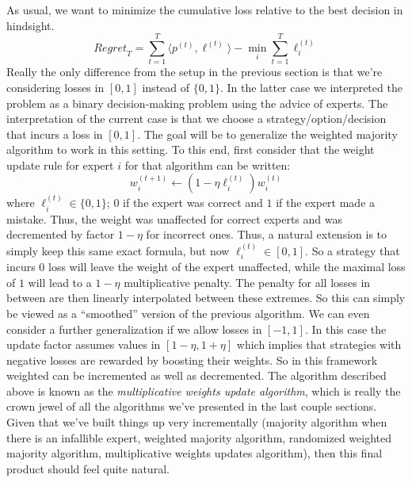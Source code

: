 \documentclass[12pt]{article}
\begin{document}
As usual, we want to minimize the cumulative loss relative to the best decision in hindsight. 
\[\textit{Regret}_T = \sum_{t = 1}^{T} \langle p^{(t)}, \ell^{(t)}\rangle - \min_i \sum_{t = 1}^{T} \ell_i^{(t)}\]
Really the only difference from the setup in the previous section is that we're considering losses in $[0, 1]$ instead of $\{0, 1\}$. In the latter case we interpreted the problem as a binary decision-making
problem using the advice of experts. The interpretation of the current case is that we choose a strategy/option/decision that incurs a loss in $[0, 1]$. The goal will be to generalize the weighted majority 
algorithm to work in this setting. To this end, first consider that the weight update rule for expert $i$ for that algorithm can be written:
\[w_i^{(t + 1)} \gets (1 - \eta \ell_i^{(t)})w_i^{(t)}\]
where $\ell_i^{(t)} \in \{0, 1\}$; $0$ if the expert was correct and $1$ if the expert made a mistake. Thus, the weight was unaffected for correct experts and was decremented by factor $1 - \eta$ for 
incorrect ones. Thus, a natural extension is to simply keep this same exact formula, but now $ \ell_i^{(t)} \in [0, 1]$. So a strategy that incurs $0$ loss will leave the weight of the expert unaffected, while 
the maximal loss of $1$ will lead to a $1 - \eta$ multiplicative penalty. The penalty for all losses in between are then linearly interpolated between these extremes. So this can simply be viewed as a 
``smoothed'' version of the previous algorithm. We can even consider a further generalization if we allow losses in $[-1, 1]$. In this case the update factor assumes values in $[1 - \eta, 1 + \eta]$
which implies that strategies with negative losses are rewarded by boosting their weights. So in this framework weighted can be incremented as well as decremented. The algorithm described above 
is known as the \textit{multiplicative weights update algorithm}, which is really the crown jewel of all the algorithms we've presented in the last couple sections. Given that we've built things up 
very incrementally (majority algorithm when there is an infallible expert, weighted majority algorithm, randomized weighted majority algorithm, multiplicative weights updates algorithm), then this 
final product should feel quite natural. 

\bigskip
\end{document}
